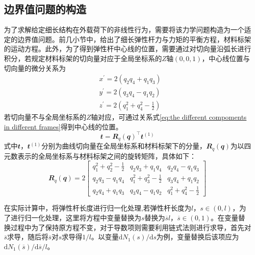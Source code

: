\subsection{边界值问题的构造}
为了求解给定细长结构在外载荷下的非线性行为，需要将该力学问题构造为一个适定的边界值问题。前几小节中，给出了细长弹性杆力与力矩的平衡方程，材料标架的运动方程。此外，为了得到弹性杆中心线的位置，需要通过对切向量沿弧长进行积分，若规定材料标架的切向量对应于全局坐标系的$Z$轴$(0,0,1)$，中心线位置与切向量的微分关系为
\begin{equation}
	\begin{split}
	&x^{\prime}=2\left(q_{2} q_{4}+q_{1} q_{3}\right)\\ 
	&y^{\prime}=2\left(q_{3} q_{4}-q_{1} q_{2}\right)\\ 
	&z^{\prime}=2\left(q_{1}^{2}+q_{4}^{2}-\frac{1}{2}\right)
	\end{split}
\end{equation}
若切向量不与全局坐标系的$Z$轴对应，可通过关系式\eqref{eq:the different compoments in different frames}得到中心线的位置。
\begin{equation}
	\mathbfit{t}=\mathbfit{R}_q(\mathbfit{q})^{\top}\mathbfit{t}^{(1)}
	\label{eq:the different compoments in different frames}
\end{equation}
式中$\mathbfit{t}$，$\mathbfit{t}^{(1)}$分别为曲线切向量在全局坐标系和材料标架下的分量，$\mathbfit{R}_q(\mathbfit{q})$为以四元数表示的全局坐标系与材料标架之间的旋转矩阵\cite{henderson1977euler}，具体如下：
\begin{equation}
	\mathbfit{R}_{q}(\mathbfit{q})= 2\left[\begin{array}{ccc}q_{1}^{2}+q_{2}^{2}-\frac{1}{2} &  q_{2} q_{3}+ q_{1} q_{4} &  q_{2} q_{4}- q_{1} q_{3} \\ q_{2} q_{3}- q_{1} q_{4} & q_{1}^{2}+q_{3}^{2}-\frac{1}{2} &  q_{3} q_{4}+ q_{1} q_{2} \\ q_{2} q_{4}+ q_{1} q_{3} &  q_{3} q_{4}- q_{1} q_{2} & q_{1}^{2}+q_{4}^{2}-\frac{1}{2}\end{array}\right] 
		\label{eq:Rotation Matrix}
\end{equation}

在实际计算中，将弹性杆长度进行归一化处理,若弹性杆长度为$l$，$s\in(0,l)$，为了进行归一化处理，这里将方程中变量替换为$s$替换为$\overline sl$，$\overline s\in(0,1)$。在变量替换过程中为了保持原方程不变，对于导数项则需要利用链式法则进行求导，首先对$\overline s$求导，随后将$\overline s$对$s$求导得$1/l$。以变量$\mathrm{d}N_1(s)/\mathrm{d}s$为例，变量替换后该项应为$\mathrm{d}N_1(\overline s)/\mathrm{d}\overline{s}/l$。

